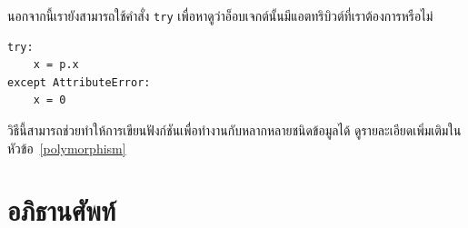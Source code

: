 นอกจากนี้เรายังสามารถใช้คำสั่ง {\tt try} เพื่อหาดูว่าอ็อบเจกต์นั้นมีแอตทริบิวต์ที่เราต้องการหรือไม่


\begin{verbatim}
try:
    x = p.x
except AttributeError:
    x = 0
\end{verbatim}


วิธีนี้สามารถช่วยทำให้การเขียนฟังก์ชันเพื่อทำงานกับหลากหลายชนิดข้อมูลได้ ดูรายละเอียดเพิ่มเติมในหัวข้อ~\ref{polymorphism} 

\section{อภิธานศัพท์}

